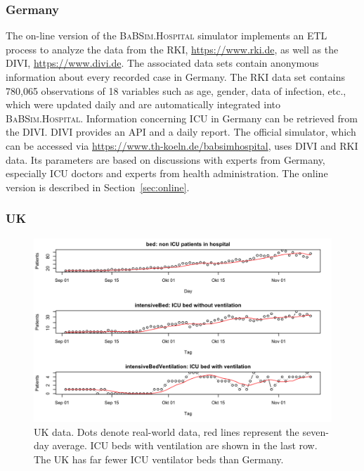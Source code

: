 \documentclass[conference]{IEEEtran}
\newcommand{\babsimhospital}{\textsc{BaBSim.Hospital}\xspace}
\begin{document}
\subsubsection{Germany}
The on-line version of the \babsimhospital simulator implements an \gls{ETL} process to analyze the data from the \gls{RKI}, \url{https://www.rki.de}, as well as the \gls{DIVI}, \url{https://www.divi.de}.
The associated data sets contain anonymous information about every recorded case in Germany. The \gls{RKI} data set contains 
780,065 observations of 18 variables such as age, gender, data of infection, etc., which were updated daily and are automatically integrated into \babsimhospital. 
Information concerning \gls{ICU} in Germany can be retrieved from the \gls{DIVI}.
\gls{DIVI} provides an API and a daily report. 
The official simulator, which can be accessed via \url{https://www.th-koeln.de/babsimhospital}, uses \gls{DIVI} and \gls{RKI} data.
Its parameters are based on discussions with experts from Germany, especially \gls{ICU} doctors and experts from health administration.
The online version is described in Section~\ref{sec:online}.



\subsubsection{UK}
\begin{figure}
    \centering
    \includegraphics[width=0.75\linewidth]{ukdata3.png}
    \caption{UK data. Dots denote real-world data, red lines represent the seven-day average. \gls{ICU} beds with ventilation are shown in the last row. The UK has far fewer \gls{ICU} ventilator beds than Germany.}
\label{fig:ukdata}
\end{figure}
\end{document}
